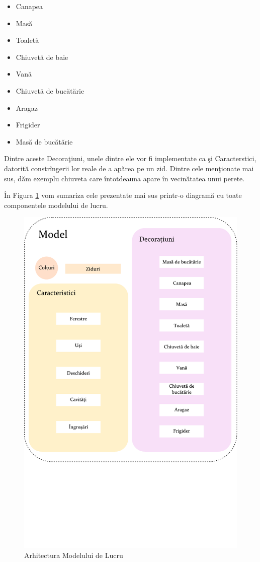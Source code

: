 \begin{itemize}
  \item Canapea
  \item Masă
  \item Toaletă
  \item Chiuvetă de baie
  \item Vană
  \item Chiuvetă de bucătărie
  \item Aragaz
  \item Frigider
  \item Masă de bucătărie
\end{itemize}

Dintre aceste Decoraţiuni, unele dintre ele vor fi implementate ca şi 
Caracterstici, datorită constrîngerii lor reale de a apărea pe un zid. Dintre 
cele menţionate mai sus, dăm exemplu chiuveta care întotdeauna apare în 
vecinătatea unui perete.

În Figura \ref{figure:model-arh} vom sumariza cele prezentate mai sus printr-o 
diagramă cu toate componentele modelului de lucru.

\begin{figure}[htp]
\begin{center} 
\includegraphics[width=\textwidth]{figures/drawing.pdf} \caption{Arhitectura 
Modelului de Lucru}
  \label{figure:model-arh}
\end{center}
\end{figure}

